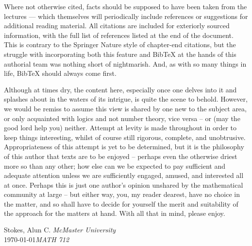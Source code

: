 Where not otherwise cited, facts should be supposed to have been taken from the lectures — which themselves will periodically include references or suggestions for additional reading material. All citations are included for exteriorly sourced information, with the full list of references listed at the end of the document. This is contrary to the Springer Nature style of chapter-end citations, but the struggle with incorporating both this feature and BibTeX at the hands of this authorial team was nothing short of nightmarish. And, as with so many things in life, BibTeX should always come first.

Although at times dry, the content here, especially once one delves into it and splashes about in the waters of its intrigue, is quite the scene to behold. However, we would be remiss to assume this view is shared by one new to the subject area, or only acquainted with logics and not number theory, vice versa -- or (may the good lord help you) neither. Attempt at levity is made throughout in order to keep things interesting, whilst of course still rigorous, complete, and unobtrusive. Appropriateness of this attempt is yet to be determined, but it is the philosophy of this author that texts are to be enjoyed -- perhaps even the otherwise driest more so than any other; how else can we be expected to pay sufficient and adequate attention unless we are sufficiently engaged, amused, and interested all at once. Perhaps this is just one author's opinion unshared by the mathematical community at large -- but either way, you, my reader dearest, have no choice in the matter, and so shall have to decide for yourself the merit and suitability of the approach for the matters at hand. With all that in mind, please enjoy.


\vspace{\baselineskip}
\begin{flushright}\noindent
Stokes,  Alun C. \hfill {\it McMaster University}\\
\monthyeardate\today \hfill {\it MATH 712}\\
\end{flushright}



